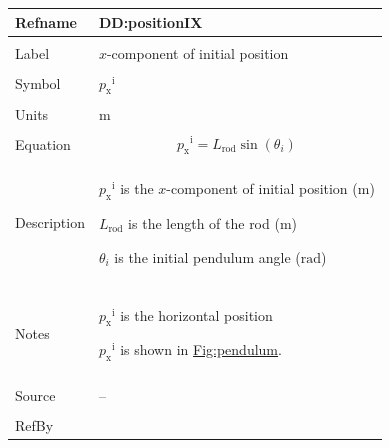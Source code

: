 \documentclass[12pt]{article}
\begin{document}
\vspace{\baselineskip}
\noindent
\begin{minipage}{\textwidth}
\begin{tabular}{>{\raggedright}p{}>{\raggedright\arraybackslash}p{}}
\toprule \textbf{Refname} & \textbf{DD:positionIX}
\label{DD:positionIX}
\\ \midrule \\
Label & $x$-component of initial position
        
\\ \midrule \\
Symbol & ${{p_{\text{x}}}^{\text{i}}}$
         
\\ \midrule \\
Units & ${\text{m}}$
        
\\ \midrule \\
Equation & \begin{displaymath}
           {{p_{\text{x}}}^{\text{i}}}={L_{\text{rod}}} \sin\left({θ_{i}}\right)
           \end{displaymath}
\\ \midrule \\
Description & \begin{symbDescription}
              \item{${{p_{\text{x}}}^{\text{i}}}$ is the $x$-component of initial position (${\text{m}}$)}
              \item{${L_{\text{rod}}}$ is the length of the rod (${\text{m}}$)}
              \item{${θ_{i}}$ is the initial pendulum angle (${\text{rad}}$)}
              \end{symbDescription}
\\ \midrule \\
Notes & ${{p_{\text{x}}}^{\text{i}}}$ is the horizontal position
        
        ${{p_{\text{x}}}^{\text{i}}}$ is shown in \hyperref[Figure:pendulum]{Fig:pendulum}.
        
\\ \midrule \\
Source & --
         
\\ \midrule \\
RefBy & 
\\ \bottomrule
\end{tabular}
\end{minipage}
\end{document}
